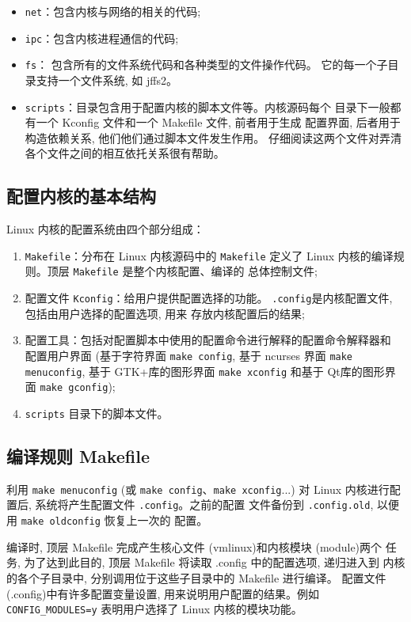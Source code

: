 \begin{itemize}
    \item \verb|net|：包含内核与网络的相关的代码;
    \item \verb|ipc|：包含内核进程通信的代码;
    \item \verb|fs|： 包含所有的文件系统代码和各种类型的文件操作代码。
        它的每一个子目录支持一个文件系统, 如 jffs2。
    \item \verb|scripts|：目录包含用于配置内核的脚本文件等。内核源码每个
        目录下一般都有一个 Kconfig 文件和一个 Makefile 文件, 前者用于生成
        配置界面, 后者用于构造依赖关系, 他们他们通过脚本文件发生作用。
        仔细阅读这两个文件对弄清各个文件之间的相互依托关系很有帮助。
\end{itemize}

\subsection{配置内核的基本结构}
Linux 内核的配置系统由四个部分组成：
\begin{enumerate}
    \item \verb|Makefile|：分布在 Linux 内核源码中的 \verb|Makefile| 定义了
        Linux 内核的编译规则。顶层 \verb|Makefile| 是整个内核配置、编译的
        总体控制文件;
    \item 配置文件 \verb|Kconfig|：给用户提供配置选择的功能。
        \verb|.config|是内核配置文件, 包括由用户选择的配置选项, 用来
        存放内核配置后的结果;
    \item 配置工具：包括对配置脚本中使用的配置命令进行解释的配置命令解释器和
        配置用户界面 (基于字符界面 \verb|make config|, 基于 ncurses 界面
        \verb|make menuconfig|, 基于 GTK+库的图形界面 \verb|make xconfig|
        和基于 Qt库的图形界面 \verb|make gconfig|);
    \item \verb|scripts| 目录下的脚本文件。
\end{enumerate}

\subsection{编译规则 Makefile}
利用 \verb|make menuconfig| (或 \verb|make config|、\verb|make xconfig|...)
对 Linux 内核进行配置后, 系统将产生配置文件 \verb|.config|。之前的配置
文件备份到 \verb|.config.old|, 以便用 \verb|make oldconfig| 恢复上一次的
配置。

编译时, 顶层 Makefile 完成产生核心文件 (vmlinux)和内核模块 (module)两个
任务, 为了达到此目的, 顶层 Makefile 将读取 .config 中的配置选项, 递归进入到
内核的各个子目录中, 分别调用位于这些子目录中的 Makefile 进行编译。
配置文件(.config)中有许多配置变量设置, 用来说明用户配置的结果。例如
\verb|CONFIG_MODULES=y| 表明用户选择了 Linux 内核的模块功能。

